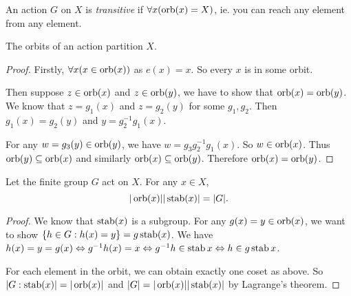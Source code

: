\documentclass[a4paper]{article}
\begin{document}
  \begin{defi}
    An action $G$ on $X$ is \emph{transitive} if $\forall x(\operatorname{orb}(x) = X)$, ie. you can reach any element from any element.
  \end{defi}

  \begin{lemma}
    The orbits of an action partition $X$.
  \end{lemma}

  \begin{proof}
    Firstly, $\forall x(x\in \operatorname{orb} (x))$ as $e(x) = x$. So every $x$ is in some orbit.

    Then suppose $z\in \operatorname{orb} (x)$ and $z\in \operatorname{orb} (y)$, we have to show that $\operatorname{orb}(x) = \operatorname{orb} (y)$. We know that $z = g_1(x)$ and $z = g_2(y)$ for some $g_1, g_2$. Then $g_1(x) = g_2(y)$ and $y = g_2^{-1}g_1(x)$.

    For any $w = g_3(y)\in \operatorname{orb} (y)$, we have $w = g_3g_2^{-1}g_1(x)$. So $w\in \operatorname{orb} (x)$. Thus $\operatorname{orb} (y) \subseteq \operatorname{orb} (x)$ and similarly $\operatorname{orb} (x) \subseteq \operatorname{orb} (y)$. Therefore $\operatorname{orb} (x) = \operatorname{orb} (y)$.
  \end{proof}

  \begin{thm}
    Let the finite group $G$ act on $X$. For any $x\in X$,
    \[
      |\operatorname{orb}(x)||\operatorname{stab}(x)| = |G|.
    \]
  \end{thm}

  \begin{proof}
    We know that $\operatorname{stab}(x)$ is a subgroup. For any $g(x) = y\in \operatorname{orb}(x)$, we want to show $\{h\in G: h(x) = y\} = g\operatorname{stab} (x)$. We have $h(x) = y = g(x) \Leftrightarrow g^{-1}h(x) = x \Leftrightarrow g^{-1}h\in \operatorname{stab} x \Leftrightarrow h\in g\operatorname{stab} x$.

    For each element in the orbit, we can obtain exactly one coset as above. So $|G: \operatorname{stab} (x)| = |\operatorname{orb} (x)|$ and $|G| = |\operatorname{orb} (x)||\operatorname{stab}(x)|$ by Lagrange's theorem.
  \end{proof}
\end{document}
